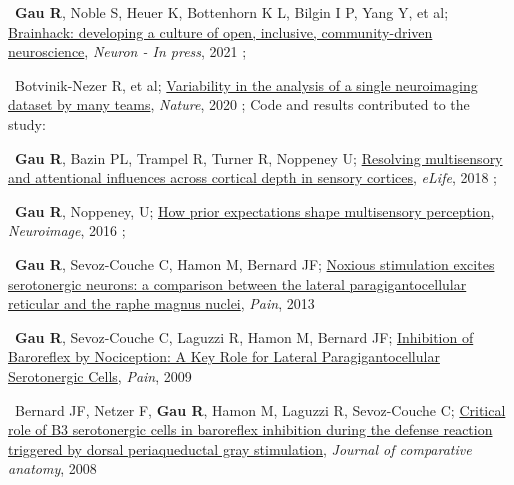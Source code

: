 

\textbullet~\textbf{Gau R}, Noble S, Heuer K, Bottenhorn K L, Bilgin I P, Yang Y, et al; 
\href{https://psyarxiv.com/rytjq/}{Brainhack: developing a culture of open, inclusive, community-driven neuroscience}, 
\textit{Neuron - In press}, 
2021
\newline
{}; 

\textbullet~Botvinik-Nezer R, et al; 
\href{https://osf.io/zac8t/}{Variability in the analysis of a single neuroimaging dataset by many teams}, 
\textit{Nature}, 
2020
\newline
{}; 
Code and results contributed to the study:

\smallskip

\textbullet~\textbf{Gau R}, Bazin PL, Trampel R, Turner R, Noppeney U; 
\href{https://osf.io/x3uak/}{Resolving multisensory and attentional influences across cortical depth in sensory cortices}, 
\textit{eLife}, 
2018
\newline
{}; 

\textbullet~\textbf{Gau R}, Noppeney, U; 
\href{https://osf.io/8frkq/}{How prior expectations shape multisensory perception}, 
\textit{Neuroimage}, 
2016
\newline
{}; 

\textbullet~\textbf{Gau R}, Sevoz-Couche C, Hamon M, Bernard JF; 
\href{https://osf.io/ktcv9/}{Noxious stimulation excites serotonergic neurons: a comparison between the lateral paragigantocellular reticular and the raphe magnus nuclei}, 
\textit{Pain}, 
2013
\newline
{}

\textbullet~\textbf{Gau R}, Sevoz-Couche C, Laguzzi R, Hamon M, Bernard JF; 
\href{https://osf.io/cqhvb/}{Inhibition of Baroreflex by Nociception: A Key Role for Lateral Paragigantocellular Serotonergic Cells}, 
\textit{Pain}, 
2009
\newline
{}

\textbullet~Bernard JF, Netzer F, \textbf{Gau R}, Hamon M, Laguzzi R, Sevoz-Couche C; 
\href{https://osf.io/rcvuj/}{Critical role of B3 serotonergic cells in baroreflex inhibition during the defense reaction triggered by dorsal periaqueductal gray stimulation}, 
\textit{Journal of comparative anatomy}, 
2008
\newline
{}
